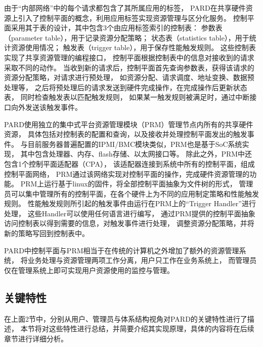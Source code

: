由于``内部网络''中的每个请求都包含了其所属应用的标签，
PARD在共享硬件资源上引入了控制平面的概念，利用应用标签实现资源管理与区分化服务。
控制平面采用其于表的设计，其中包含3个由应用标签索引的控制表：
参数表（parameter table），用于记录资源分配策略；
状态表（statistics table），用于统计资源使用情况；
触发表（trigger table），用于保存性能触发规则。
这些控制表实现了共享资源管理的编程接口，
控制平面根据控制表中的信息对接收到的请求采取不同的动作。
当收到新的请求后，控制平面首先查询参数表，获得该请求的资源分配策略，对请求进行预处理，
如资源分配、请求调度、地址变换、数据预处理等，
之后将预处理后的请求发送到硬件完成操作，在完成操作后更新状态表，
同时检查触发表以匹配触发规则，
如果某一触发规则被满足时，通过中断接口向外发送该触发事件。

PARD使用独立的集中式平台资源管理模块（PRM）管理节点内所有的共享硬件资源，
具体包括对控制表的配置和查询，以及接收并处理控制平面发出的触发事件。
与目前服务器普遍配置的IPMI/BMC模块类似，PRM也是基于SoC系统实现，
其中包含处理器、内存、flash存储、以太网接口等。
除此之外，PRM中还包含1个控制平面适配器（CPA），
该适配器连接到系统中所有的控制平面，组成控制平面网络，
PRM通过该网络实现对控制平面的操作，完成硬件资源管理的功能。
PRM上运行基于linux的固件，将全部控制平面抽象为文件树的形式，
管理员可以集中管理所有的控制平面，在各个硬件上为不同的应用制定策略和性能触发规则。
性能触发规则所引起的触发事件由运行在PRM上的``Trigger Handler''进行处理，
这些Handler可以使用任何语言进行编写，
通过PRM提供的控制平面抽象访问控制表以得到需要的信息，对触发事件进行处理，
调整资源分配策略，并将新的策略写回到控制表中。

PARD中控制平面与PRM相当于在传统的计算机之外增加了额外的资源管理系统，
将业务处理与资源管理两项工作分离，用户只工作在业务系统上，
而管理员仅在管理系统上即可实现用户资源使用的监控与管理。


\subsection{关键特性}

在上面2节中，分别从用户、管理员与体系结构视角对PARD的关键特性进行了描述，
本节将对这些特性进行总结，并简要介绍其实现原理，具体的内容将在后续章节进行详细分析。

